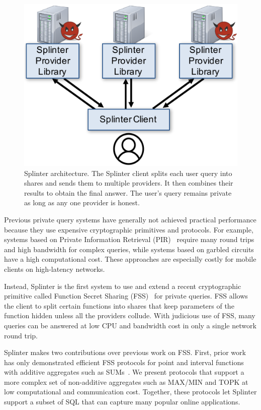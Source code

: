 \begin{figure}
	\centering
	\includegraphics[width=\textwidth]{splinter-figs/overview.pdf}
	\caption[Overview of Splinter architecture.]{
		Splinter architecture. 
		The Splinter client splits each user query into shares and sends them to multiple
		providers. It then combines their results to obtain
		the final answer.
		The user's query remains private as long as any one provider is honest.
	}
	\label{fig:overview}
\end{figure}

Previous private query systems have generally not achieved practical performance
because they use expensive cryptographic primitives and protocols.
For example, systems based on Private Information Retrieval (PIR)~\cite{goldberg,chor1997private,pir-search} require many round trips and high bandwidth for complex queries, while systems based on garbled
circuits~\cite{wu2016,lan2016embark,ben2008fairplaymp} have a high computational cost.
These approaches are especially costly for mobile clients on high-latency networks.

Instead, Splinter is the first system to use and extend a recent cryptographic primitive called
Function Secret Sharing (FSS)~\cite{fss, gilboa2014distributed} for private queries.
FSS allows the client to split certain functions into shares that keep parameters of the
function hidden unless all the providers collude.
With judicious use of FSS, many queries can be answered at low CPU and bandwidth cost in only a single network round trip.

Splinter makes two contributions over previous work on FSS.
First, prior work has only demonstrated efficient FSS protocols for point and interval functions with additive aggregates such as SUMs~\cite{fss}.
We present protocols that support a more complex set of non-additive aggregates such as MAX/MIN and TOPK at low computational and communication cost.
Together, these protocols let Splinter support a subset of SQL that can capture many popular online applications.

